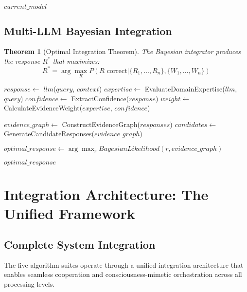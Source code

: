 \documentclass[12pt,a4paper]{article}
\newtheorem{theorem}{Theorem}[section]
\begin{document}
\begin{algorithm}
\begin{algorithmic}[1]
\begin{algorithm}
\begin{algorithmic}[1]
    \RETURN $current\_model$
\ENDPROCEDURE
\end{algorithmic}
\end{algorithm}

\subsection{Multi-LLM Bayesian Integration}

\begin{theorem}[Optimal Integration Theorem]
The Bayesian integrator produces the response $R^*$ that maximizes:
\begin{equation}
R^* = \arg\max_R P(R \text{ correct} | \{R_1, \ldots, R_n\}, \{W_1, \ldots, W_n\})
\end{equation}
\end{theorem}

\begin{algorithm}
\caption{Multi-LLM Bayesian Evidence Integration}
\begin{algorithmic}[1]
        \STATE $response \leftarrow$ $llm$($query$, $context$)
        \STATE $expertise \leftarrow$ EvaluateDomainExpertise($llm$, $query$)
        \STATE $confidence \leftarrow$ ExtractConfidence($response$)
        \STATE $weight \leftarrow$ CalculateEvidenceWeight($expertise$, $confidence$)
    \ENDFOR
    
    \STATE $evidence\_graph \leftarrow$ ConstructEvidenceGraph($responses$)
    \STATE $candidates \leftarrow$ GenerateCandidateResponses($evidence\_graph$)
    
    \STATE $optimal\_response \leftarrow \arg\max_{r} BayesianLikelihood(r, evidence\_graph)$
    
    \RETURN $optimal\_response$
\ENDPROCEDURE
\end{algorithmic}
\end{algorithm}

\section{Integration Architecture: The Unified Framework}

\subsection{Complete System Integration}

The five algorithm suites operate through a unified integration architecture that enables seamless cooperation and consciousness-mimetic orchestration across all processing levels.


\end{algorithmic}
\end{algorithm}
\end{document}

